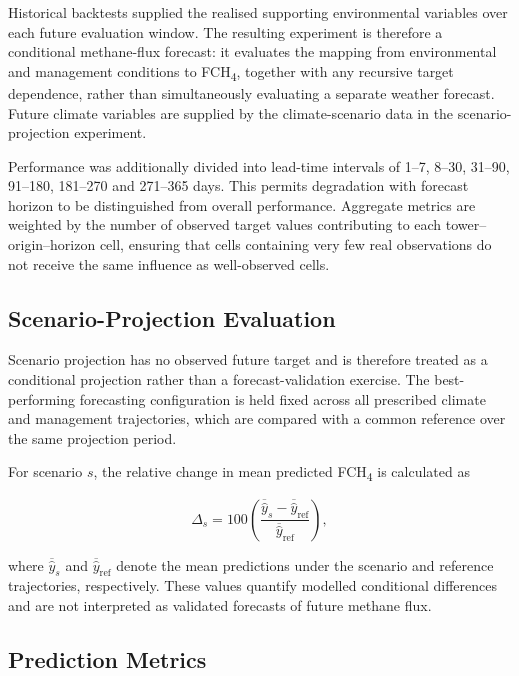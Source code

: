 Historical backtests supplied the realised supporting environmental variables
over each future evaluation window. The resulting experiment is therefore a
conditional methane-flux forecast: it evaluates the mapping from environmental
and management conditions to FCH\textsubscript{4}, together with any recursive
target dependence, rather than simultaneously evaluating a separate weather
forecast. Future climate variables are supplied by the climate-scenario data
in the scenario-projection experiment.

Performance was additionally divided into lead-time intervals of 1--7,
8--30, 31--90, 91--180, 181--270 and 271--365 days. This permits degradation
with forecast horizon to be distinguished from overall performance. Aggregate
metrics are weighted by the number of observed target values contributing to
each tower--origin--horizon cell, ensuring that cells containing very few real
observations do not receive the same influence as well-observed cells.

\subsection{Scenario-Projection Evaluation}

Scenario projection has no observed future target and is therefore treated as
a conditional projection rather than a forecast-validation exercise. The
best-performing forecasting configuration is held fixed across all prescribed
climate and management trajectories, which are compared with a common
reference over the same projection period.

For scenario \(s\), the relative change in mean predicted
FCH\textsubscript{4} is calculated as

\begin{equation}
\Delta_s
=
100
\left(
\frac{
\overline{\hat{y}}_s-\overline{\hat{y}}_{\mathrm{ref}}
}{
\overline{\hat{y}}_{\mathrm{ref}}
}
\right),
\end{equation}

where \(\overline{\hat{y}}_s\) and
\(\overline{\hat{y}}_{\mathrm{ref}}\) denote the mean predictions under the
scenario and reference trajectories, respectively. These values quantify
modelled conditional differences and are not interpreted as validated
forecasts of future methane flux.

\subsection{Prediction Metrics}

